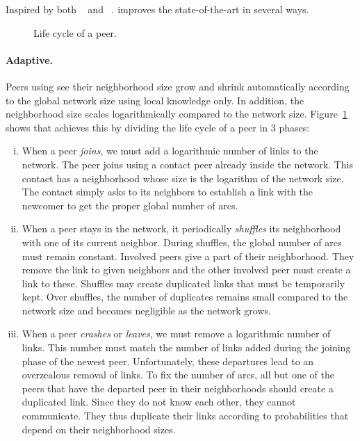 Inspired by both \SCAMP~\cite{ganesh2001scamp,ganesh2003peer} and
\CYCLON~\cite{voulgaris2005cyclon}. \SPRAY improves the
state-of-the-art in several ways.

\begin{figure}
  \begin{center}
    \hspace{20pt}
    \hspace{20pt}
    \caption{\label{fig:cycle} Life cycle of a peer.}
  \end{center}
\end{figure}

\paragraph{Adaptive.}
Peers using \SPRAY see their neighborhood size grow and shrink
automatically according to the global network size using local
knowledge only. In addition, the neighborhood size scales
logarithmically compared to the network size. Figure~\ref{fig:cycle}
shows that \SPRAY achieves this by dividing the life cycle of a peer
in 3 phases:
\begin{enumerate}[(i)]
\item When a peer \emph{joins}, we must add a logarithmic number of
  links to the network. The peer joins using a contact peer already
  inside the network. This contact has a neighborhood whose size is
  the logarithm of the network size. The contact simply asks to its
  neighbors to establish a link with the newcomer to get the proper
  global number of arcs.
\item When a peer stays in the network, it periodically \emph{shuffles} its
  neighborhood with one of its current neighbor. During shuffles, the global
  number of arcs must remain constant. Involved peers give a part of their
  neighborhood. They remove the link to given neighbors and the other involved
  peer must create a link to these. Shuffles may create duplicated links that
  must be temporarily kept.  Over shuffles, the number of duplicates remains
  small compared to the network size and becomes negligible as the network
  grows.
\item When a peer \emph{crashes} or \emph{leaves}, we must remove a
  logarithmic number of links. This number must match the number of
  links added during the joining phase of the newest
  peer. Unfortunately, these departures lead to an overzealous removal
  of links. To fix the number of arcs, all but one of the peers that
  have the departed peer in their neighborhoods should create a
  duplicated link. Since they do not know each other, they cannot
  communicate. They thus duplicate their links according to
  probabilities that depend on their neighborhood sizes.
\end{enumerate}

